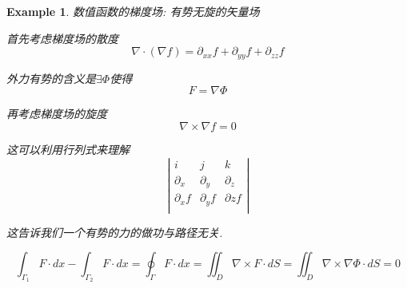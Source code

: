 \documentclass[11pt,hyperref,a4paper,UTF8]{ctexart}
\newtheorem{example}{Example}[subsection]
\begin{document}
\begin{CJK}{UTF8}{gkai}




\begin{example}
  数值函数的梯度场: 有势无旋的矢量场

  首先考虑梯度场的散度
  \[\nabla \cdot (\nabla f) = \partial_{xx} f + \partial_{yy} f + \partial_{zz} f\]

  外力有势的含义是$\exists \varPhi$使得
  \[F = \nabla \varPhi\]

  再考虑梯度场的旋度
  \[\nabla \times \nabla f = 0\]

  这可以利用行列式来理解
  \[\left|\begin{matrix}
    i & j & k\\
    \partial_x & \partial_y & \partial_z\\
    \partial_x f& \partial_y f& \partial z f\\
  \end{matrix}\right|\]

  这告诉我们一个有势的力的做功与路径无关.

  \[\int_{\Gamma_1} F\cdot dx - \int_{\Gamma_2} F \cdot dx = \oint_{\Gamma} F \cdot dx = \iint_D \nabla \times F \cdot dS = \iint_D \nabla \times \nabla \varPhi \cdot dS = 0\]
\end{example}


\end{CJK}
\end{document}
